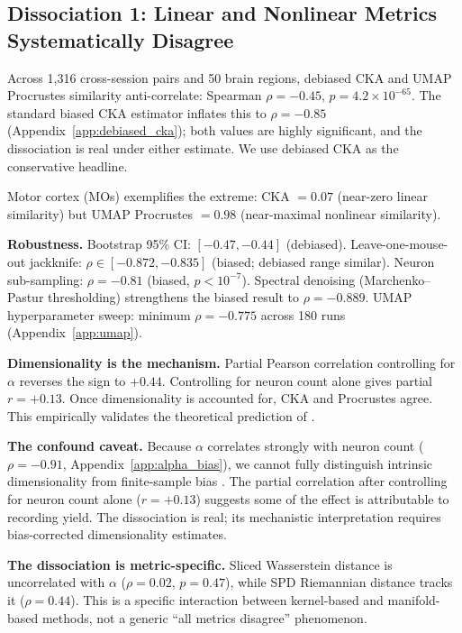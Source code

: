 \documentclass{article}
\begin{document}
\subsection{Dissociation 1: Linear and Nonlinear Metrics Systematically Disagree}
\label{sec:dissociation1}

Across 1,316 cross-session pairs and 50 brain regions, debiased CKA and UMAP Procrustes similarity anti-correlate: Spearman $\rho = -0.45$, $p = 4.2 \times 10^{-65}$. The standard biased CKA estimator inflates this to $\rho = -0.85$ (Appendix~\ref{app:debiased_cka}); both values are highly significant, and the dissociation is real under either estimate. We use debiased CKA as the conservative headline.

Motor cortex (MOs) exemplifies the extreme: CKA $= 0.07$ (near-zero linear similarity) but UMAP Procrustes $= 0.98$ (near-maximal nonlinear similarity).

\textbf{Robustness.} Bootstrap 95\% CI: $[-0.47, -0.44]$ (debiased). Leave-one-mouse-out jackknife: $\rho \in [-0.872, -0.835]$ (biased; debiased range similar). Neuron sub-sampling: $\rho = -0.81$ (biased, $p < 10^{-7}$). Spectral denoising (Marchenko--Pastur thresholding) strengthens the biased result to $\rho = -0.889$. UMAP hyperparameter sweep: minimum $\rho = -0.775$ across 180 runs (Appendix~\ref{app:umap}).

\textbf{Dimensionality is the mechanism.} Partial Pearson correlation controlling for $\alpha$ reverses the sign to $+0.44$. Controlling for neuron count alone gives partial $r = +0.13$. Once dimensionality is accounted for, CKA and Procrustes agree. This empirically validates the theoretical prediction of \citet{harvey2024representational}.

\textbf{The confound caveat.} Because $\alpha$ correlates strongly with neuron count ($\rho = -0.91$, Appendix~\ref{app:alpha_bias}), we cannot fully distinguish intrinsic dimensionality from finite-sample bias \citep{chun2025dimensionality}. The partial correlation after controlling for neuron count alone ($r = +0.13$) suggests some of the effect is attributable to recording yield. The dissociation is real; its mechanistic interpretation requires bias-corrected dimensionality estimates.

\textbf{The dissociation is metric-specific.} Sliced Wasserstein distance is uncorrelated with $\alpha$ ($\rho = 0.02$, $p = 0.47$), while SPD Riemannian distance tracks it ($\rho = 0.44$). This is a specific interaction between kernel-based and manifold-based methods, not a generic ``all metrics disagree'' phenomenon.
\end{document}
